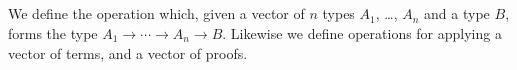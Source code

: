 {\begin{code}
\\
\>  \AgdaSymbol{=} \<%
\\
%
\\
\> \AgdaSymbol{:}  \AgdaSymbol{\{}\AgdaSymbol{\}} \AgdaSymbol{\{}    \AgdaSymbol{:}  \AgdaSymbol{\}}            \<%
\\
\>  \AgdaSymbol{=} \<%
\end{code}
}

We define the operation which, given a vector of $n$ types $A_1$, \ldots, $A_n$ and a type $B$, forms the type $A_1 \rightarrow \cdots \rightarrow A_n \rightarrow B$.  Likewise we define operations for applying a vector of terms, and a vector of proofs.

